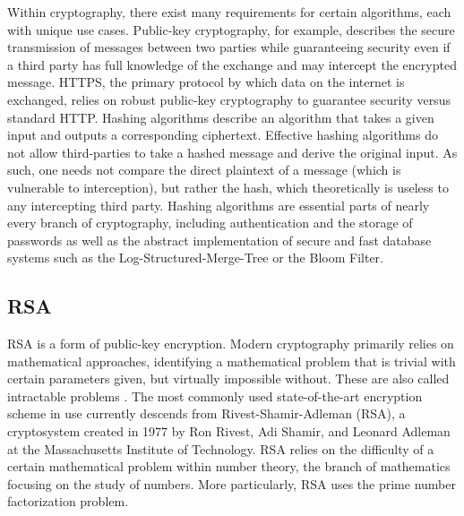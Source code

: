 \documentclass[12pt]{article}
\begin{document}
Within cryptography, there exist many requirements for certain algorithms, each with unique use cases.
Public-key cryptography, for example, describes the secure transmission of messages between two parties while guaranteeing security even if a third party has full knowledge of the exchange and may intercept the encrypted message.
HTTPS, the primary protocol by which data on the internet is exchanged, relies on robust public-key cryptography to guarantee security versus standard HTTP\@.
Hashing algorithms describe an algorithm that takes a given input and outputs a corresponding ciphertext.
Effective hashing algorithms do not allow third-parties to take a hashed message and derive the original input.
As such, one needs not compare the direct plaintext of a message (which is vulnerable to interception), but rather the hash, which theoretically is useless to any intercepting third party.
Hashing algorithms are essential parts of nearly every branch of cryptography, including authentication and the storage of passwords as well as the abstract implementation of secure and fast database systems such as the Log-Structured-Merge-Tree or the Bloom Filter.

\subsection{RSA}\label{subsec:rsa}
RSA is a form of public-key encryption.
Modern cryptography primarily relies on mathematical approaches, identifying a mathematical problem that is trivial with certain parameters given, but virtually impossible without. These are also called intractable problems \autocite{lam_cryptography_2001}.
The most commonly used state-of-the-art encryption scheme in use currently descends from Rivest-Shamir-Adleman (RSA), a cryptosystem created in 1977 by Ron Rivest, Adi Shamir, and Leonard Adleman at the Massachusetts Institute of Technology.
RSA relies on the difficulty of a certain mathematical problem within number theory, the branch of mathematics focusing on the study of numbers.
More particularly, RSA uses the prime number factorization problem.
\end{document}

